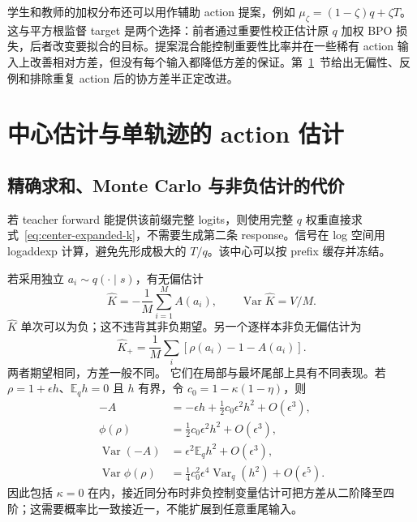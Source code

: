 \documentclass[lang=cn,scheme=chinese,openany]{../book/elegantbook}
\newcommand{\E}{\mathbb E}
\newcommand{\Var}{\operatorname{Var}}
\begin{document}
学生和教师的加权分布还可以用作辅助 action 提案，例如 $\mu_\zeta=(1-\zeta)q+\zeta T$。这与平方根监督 target 是两个选择：前者通过重要性校正估计原 $q$ 加权 BPO 损失，后者改变要拟合的目标。提案混合能控制重要性比率并在一些稀有 action 输入上改善相对方差，但没有每个输入都降低方差的保证。第~\ref{sec:power-estimators}~节给出无偏性、反例和排除重复 action 后的协方差半正定改进。



\section{中心估计与单轨迹的 action 估计}
\label{sec:power-estimators}
\label{sec:center-extensions}

\subsection{精确求和、Monte Carlo 与非负估计的代价}

若 teacher forward 能提供该前缀完整 logits，则使用完整 $q$ 权重直接求式~\eqref{eq:center-expanded-k}，不需要生成第二条 response。信号在 log 空间用 logaddexp 计算，避免先形成极大的 $T/q$。该中心可以按 prefix 缓存并冻结。

若采用独立 $a_i\sim q(\cdot\mid s)$，有无偏估计
\begin{equation}
 \widehat K=-\frac1M\sum_{i=1}^MA(a_i),\qquad
 \Var\widehat K=V/M.
\end{equation}
$\widehat K$ 单次可以为负；这不违背其非负期望。另一个逐样本非负无偏估计为
\begin{equation}
 \widehat K_+=\frac1M\sum_i[\rho(a_i)-1-A(a_i)].
\end{equation}
两者期望相同，方差一般不同。 它们在局部与最坏尾部上具有不同表现。若 $\rho=1+\epsilon h$、$\E_qh=0$ 且 $h$ 有界，令 $c_0=1-\kappa(1-\eta)$，则
\begin{align}
 -A&=-\epsilon h+\tfrac12c_0\epsilon^2h^2+O(\epsilon^3),\\
 \phi(\rho)&=\tfrac12c_0\epsilon^2h^2+O(\epsilon^3),\\
 \Var(-A)&=\epsilon^2\E_qh^2+O(\epsilon^3),\\
 \Var\phi(\rho)&=\tfrac14c_0^2\epsilon^4\Var_q(h^2)+O(\epsilon^5).
\end{align}
因此包括 $\kappa=0$ 在内，接近同分布时非负控制变量估计可把方差从二阶降至四阶；这需要概率比一致接近一，不能扩展到任意重尾输入。
\end{document}
